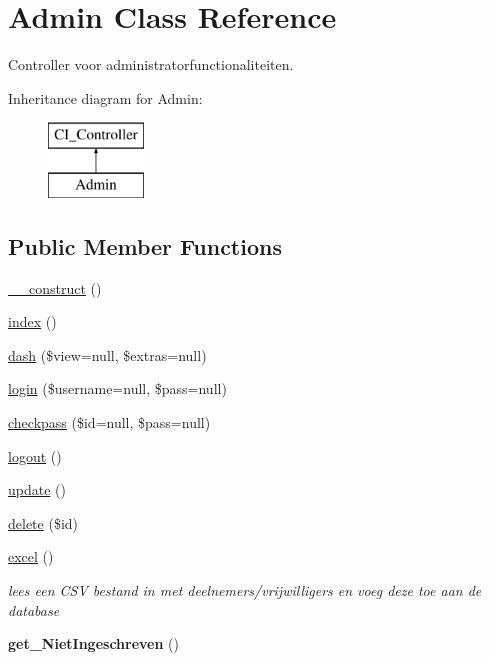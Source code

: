 \hypertarget{class_admin}{}\section{Admin Class Reference}
\label{class_admin}


Controller voor administratorfunctionaliteiten.  


Inheritance diagram for Admin\+:\begin{figure}[H]
\begin{center}
\leavevmode
\includegraphics[height=2.000000cm]{class_admin}
\end{center}
\end{figure}
\subsection*{Public Member Functions}
\begin{DoxyCompactItemize}
\item 
\mbox{\hyperlink{class_admin_a14eb545baec47d1bccb823fdcea061d4}{\+\_\+\+\_\+construct}} ()
\item 
\mbox{\hyperlink{class_admin_ae7187e96036e6bd23086e02b936b214a}{index}} ()
\item 
\mbox{\hyperlink{class_admin_a7c5b27650e2fd63227f09ece49beb2e9}{dash}} (\$view=null, \$extras=null)
\item 
\mbox{\hyperlink{class_admin_ae84deedea35076345e2e892ea0d60413}{login}} (\$username=null, \$pass=null)
\item 
\mbox{\hyperlink{class_admin_a3a644a6067cccdf84a5649a7777c1197}{checkpass}} (\$id=null, \$pass=null)
\item 
\mbox{\hyperlink{class_admin_ac008e1e771793cdd2b8223eec46061ae}{logout}} ()
\item 
\mbox{\hyperlink{class_admin_a5c7b585615c86fd80fe4b2dd8e282da0}{update}} ()
\item 
\mbox{\hyperlink{class_admin_af559704017572a72fef6280a651e1245}{delete}} (\$id)
\item 
\mbox{\label{class_admin_a6f3af7077b5bdaee0e8d4b43c0af9094}} 
\mbox{\hyperlink{class_admin_a6f3af7077b5bdaee0e8d4b43c0af9094}{excel}} ()
\begin{DoxyCompactList}\small\item\em lees een C\+SV bestand in met deelnemers/vrijwilligers en voeg deze toe aan de database \end{DoxyCompactList}\item 
\mbox{\label{class_admin_a1842b1e31f070f58cc1a494739708244}} 
{\bfseries get\+\_\+\+Niet\+Ingeschreven} ()
\end{DoxyCompactItemize}


